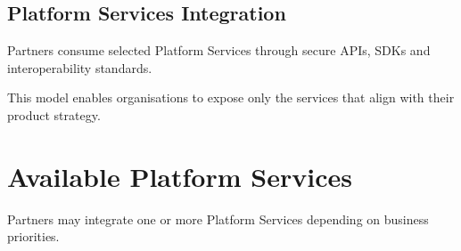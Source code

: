 
\subsection{Platform Services Integration}

\begin{partnerbox}

Partners consume selected Platform Services through secure APIs, SDKs and interoperability standards.

This model enables organisations to expose only the services that align with their product strategy.

\end{partnerbox}


\section{Available Platform Services}

Partners may integrate one or more Platform Services depending on business priorities.

\renewcommand{\arraystretch}{1.5}

